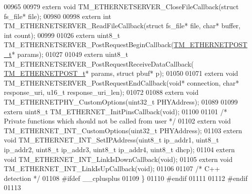 \begin{DoxyCode}
00965 
00979 \textcolor{keyword}{extern} \textcolor{keywordtype}{void} TM\_ETHERNETSERVER\_CloseFileCallback(\textcolor{keyword}{struct} fs\_file* file);
00980 
00998 \textcolor{keyword}{extern} \textcolor{keywordtype}{int} TM\_ETHERNETSERVER\_ReadFileCallback(\textcolor{keyword}{struct} fs\_file* file, \textcolor{keywordtype}{char}* buffer, \textcolor{keywordtype}{int} count);
00999 
01026 \textcolor{keyword}{extern} uint8\_t TM\_ETHERNETSERVER\_PostRequestBeginCallback(\hyperlink{struct_t_m___e_t_h_e_r_n_e_t_p_o_s_t__t}{TM\_ETHERNETPOST\_t}* params);
01027 
01049 \textcolor{keyword}{extern} uint8\_t TM\_ETHERNETSERVER\_PostRequestReceiveDataCallback(
      \hyperlink{struct_t_m___e_t_h_e_r_n_e_t_p_o_s_t__t}{TM\_ETHERNETPOST\_t}* params, \textcolor{keyword}{struct} pbuf* p);
01050 
01071 \textcolor{keyword}{extern} \textcolor{keywordtype}{void} TM\_ETHERNETSERVER\_PostRequestEndCallback(\textcolor{keywordtype}{void}* connection, \textcolor{keywordtype}{char}* response\_uri, u16\_t 
      response\_uri\_len);
01072 
01088 \textcolor{keyword}{extern} \textcolor{keywordtype}{void} TM\_ETHERNETPHY\_CustomOptions(uint32\_t PHYAddress);
01089 
01099 \textcolor{keyword}{extern} uint8\_t TM\_ETHERNET\_InitPinsCallback(\textcolor{keywordtype}{void});
01100 
01101 \textcolor{comment}{/* Private functions which should not be called from user */}
01102 \textcolor{keyword}{extern} \textcolor{keywordtype}{void} TM\_ETHERNET\_INT\_CustomOptions(uint32\_t PHYAddress);
01103 \textcolor{keyword}{extern} \textcolor{keywordtype}{void} TM\_ETHERNET\_INT\_SetIPAddress(uint8\_t ip\_addr1, uint8\_t ip\_addr2, uint8\_t ip\_addr3, uint8\_t 
      ip\_addr4, uint8\_t dhcp);
01104 \textcolor{keyword}{extern} \textcolor{keywordtype}{void} TM\_ETHERNET\_INT\_LinkIsDownCallback(\textcolor{keywordtype}{void});
01105 \textcolor{keyword}{extern} \textcolor{keywordtype}{void} TM\_ETHERNET\_INT\_LinkIsUpCallback(\textcolor{keywordtype}{void});
01106 
01107 \textcolor{comment}{/* C++ detection */}
01108 \textcolor{preprocessor}{#ifdef \_\_cplusplus}
01109 \}
01110 \textcolor{preprocessor}{#endif}
01111 
01112 \textcolor{preprocessor}{#endif}
01113 
\end{DoxyCode}

